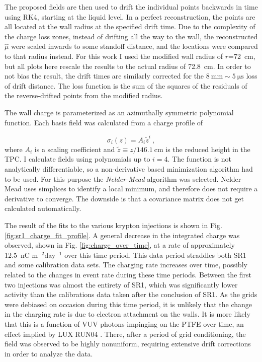 The proposed fields are then used to drift the individual points backwards in time using RK4, starting at the liquid level.
In a perfect reconstruction, the points are all located at the wall radius at the specified drift time.
Due to the complexity of the charge loss zones, instead of drifting all the way to the wall, the reconstructed $\hat{\mu}$ were scaled inwards to some standoff distance, and the locations were compared to that radius instead.
For this work I used the modified wall radius of $r$=72~cm, but all plots here rescale the results to the actual radius of 72.8~cm.
In order to not bias the result, the drift times are similarly corrected for the $8\mathrm{~mm}\sim5 \mathrm{~\mu s}$ loss of drift distance.
The loss function is the sum of the squares of the residuals of the reverse-drifted points from the modified radius.

The wall charge is parameterized as an azimuthally symmetric polynomial function.
Each basis field was calculated from a charge profile of

\begin{equation}
    \sigma_i(z) = A_i \tilde z^i~,
\end{equation}
\noindent
where $A_i$ is a scaling coefficient and $\tilde z \equiv z / 146.1 \mathrm{~cm}$ is the reduced height in the TPC.
I calculate fields using polynomials up to $i=4$.
The function is not analytically differentiable, so a non-derivative based minimization algorithm had to be used.
For this purpose the \textit{Nelder-Mead} algorithm\cite{nelder_simplex_1965} was selected.
Nelder-Mead uses simplices to identify a local minimum, and therefore does not require a derivative to converge.
The downside is that a covariance matrix does not get calculated automatically.

The result of the fits to the various krypton injections is shown in Fig. \ref{fig:sr1_charge_fit_profile}.
A general decrease in the integrated charge was observed, shown in Fig. \ref{fig:charge_over_time}, at a rate of approximately 12.5~nC m$^{-2}$day$^{-1}$ over this time period.
This data period straddles both SR1 and some calibration data sets.
The charging rate increases over time, possibly related to the changes in event rate during these time periods.
Between the first two injections was almost the entirety of SR1, which was significantly lower activity than the calibrations data taken after the conclusion of SR1. 
As the grids were debiased on occasion during this time period, it is unlikely that the change in  the charging rate is due to electron attachment on the walls.
It is more likely that this is a function of VUV photons impinging on the PTFE over time, an effect implied by LUX RUN04 \cite{lux_collaboration_3d_2017}.
There, after a period of grid conditioning, the field was observed to be highly nonuniform, requiring extensive drift corrections in order to analyze the data.


